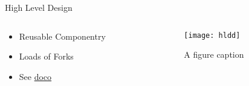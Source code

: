 \begin{frame}{High Level Design}

  \begin{columns}
    \begin{column}{0.5\linewidth}
      \begin{itemize}
        \item Reusable Componentry
        \item Loads of Forks
        \item See \href{https://github.com/stackql/stackql/blob/main/docs/high-level-design.md} {doco}
      \end{itemize}
    \end{column}
    \begin{column}{0.5\linewidth}
      \begin{figure}
        \centering
          \texttt{[image: hldd]}
        \caption{A figure caption}
      \end{figure}
    \end{column}
  \end{columns}


\end{frame}
